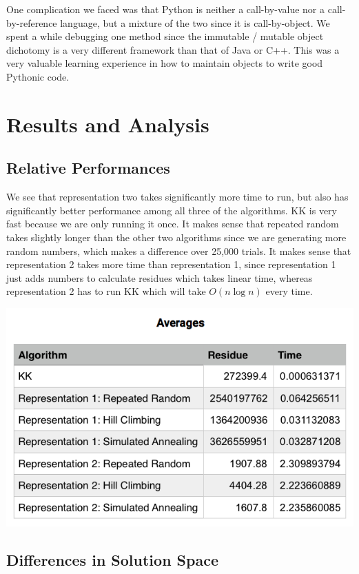 \documentclass[11pt]{article}
\begin{document}
One complication we faced was that Python is neither a call-by-value nor a call-by-reference language, but a mixture of the two since it is call-by-object. We spent a while debugging one method since the immutable / mutable object dichotomy is a very different framework than that of Java or C++. This was a very valuable learning experience in how to maintain objects to write good Pythonic code.


\section{Results and Analysis}
\subsection{Relative Performances}
We see that representation two takes significantly more time to run, but also has significantly better performance among all three of the algorithms. KK is very fast because we are only running it once. It makes sense that repeated random takes slightly longer than the other two algorithms since we are generating more random numbers, which makes a difference over 25,000 trials. It makes sense that representation 2 takes more time than representation 1, since representation 1 just adds numbers to calculate residues which takes linear time, whereas representation 2 has to run KK which will take $O(n\log n)$ every time. 

\begin{center}
\includegraphics[scale=0.9]{avtab.png}
\end{center}

\subsection{Differences in Solution Space}
\end{document}
